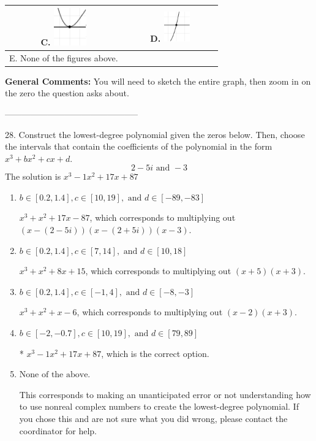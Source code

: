 \documentclass{article}[14pt]
\begin{document}
\begin{tabular}{|c|c|}
 \textbf{C.} \includegraphics[width=0.3\textwidth]{../Figures/zeroBehaviorPositiveEvenC.png} & \textbf{D.} \includegraphics[width=0.3\textwidth]{../Figures/zeroBehaviorPositiveOddC.png} \tabularnewline 
\hline 
 E. None of the figures above. & \tabularnewline 
\hline 
 \end{tabular} 
 
\textbf{General Comments:} You will need to sketch the entire graph, then zoom in on the zero the question asks about.

-----------------------------------------------

28. Construct the lowest-degree polynomial given the zeros below. Then, choose the intervals that contain the coefficients of the polynomial in the form $x^3+bx^2+cx+d$.
$$ 2 - 5i \text{ and } -3 $$ 
The solution is $ x^{3} -1 x^{2} +17 x + 87 $ 

\begin{enumerate}[label=\Alph*.] 
\item $ b \in [0.2, 1.4], c \in [10, 19], \text{ and } d \in [-89, -83] $ 

 $x^{3} + x^{2} +17 x -87$, which corresponds to multiplying out $(x-(2 - 5i))(x-(2 + 5i))(x -3)$. 
\item $ b \in [0.2, 1.4], c \in [7, 14], \text{ and } d \in [10, 18] $ 

 $x^{3} + x^{2} +8 x + 15$, which corresponds to multiplying out $(x + 5)(x + 3)$. 
\item $ b \in [0.2, 1.4], c \in [-1, 4], \text{ and } d \in [-8, -3] $ 

 $x^{3} + x^{2} +x -6$, which corresponds to multiplying out $(x -2)(x + 3)$. 
\item $ b \in [-2, -0.7], c \in [10, 19], \text{ and } d \in [79, 89] $ 

 * $x^{3} -1 x^{2} +17 x + 87$, which is the correct option. 
\item $ \text{None of the above.} $ 

 This corresponds to making an unanticipated error or not understanding how to use nonreal complex numbers to create the lowest-degree polynomial. If you chose this and are not sure what you did wrong, please contact the coordinator for help. 
\end{enumerate} 
 
\end{document}
